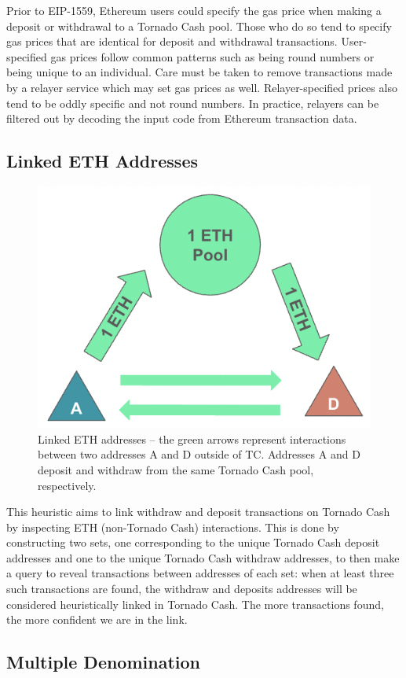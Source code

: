 Prior to EIP-1559, Ethereum users could specify the gas price when making a deposit or withdrawal to a Tornado Cash pool. Those who do so tend to specify gas prices that are identical for deposit and withdrawal transactions. User-specified gas prices follow common patterns such as being round numbers or being unique to an individual. Care must be taken to remove transactions made by a relayer service which may set gas prices as well. Relayer-specified prices also tend to be oddly specific and not round numbers. In practice, relayers can be filtered out by decoding the input code from Ethereum transaction data.

\subsection{Linked ETH Addresses}

\begin{figure}[h!]
\centering
\includegraphics[width=0.6\linewidth]{figures/tcash/h3.png}
\caption{Linked ETH addresses -- the green arrows represent interactions between two addresses A and D outside of TC. Addresses A and D deposit and withdraw from the same Tornado Cash pool, respectively.}
\label{fig:tornado}
\end{figure}

This heuristic aims to link withdraw and deposit transactions on Tornado Cash by inspecting ETH (non-Tornado Cash) interactions. This is done by constructing two sets, one corresponding to the unique Tornado Cash deposit addresses and one to the unique Tornado Cash withdraw addresses, to then make a query to reveal transactions between addresses of each set: when at least three such transactions are found, the withdraw and deposits addresses will be considered heuristically linked in Tornado Cash. The more transactions found, the more confident we are in the link.

\subsection{Multiple Denomination}


